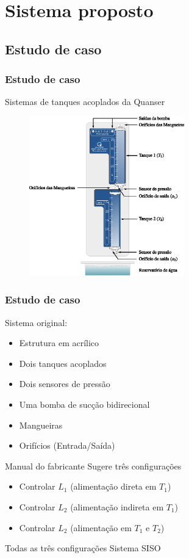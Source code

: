 \documentclass{beamer}
\begin{document}
\section{Sistema proposto}
\subsection{Estudo de caso}
\begin{frame}
    \frametitle{Estudo de caso}

    Sistemas de tanques acoplados da Quanser\reg

\begin{figure}[htb]
\centering
    \includegraphics[width=0.6\textwidth]{imgs/sistema/eps/tanques}
\end{figure}
\end{frame}

\begin{frame}
    \frametitle{Estudo de caso}

    Sistema original:

\begin{itemize}
    \item Estrutura em acrílico
    \item Dois tanques acoplados
    \item Dois sensores de pressão
    \item Uma bomba de sucção bidirecional
    \item Mangueiras
    \item Orifícios (Entrada/Saída)
\end{itemize}

    Manual do fabricante \implica Sugere três configurações

\begin{itemize}
    \item Controlar $L_1$ (alimentação direta em $T_1$)
    \item Controlar $L_2$ (alimentação indireta em $T_1$)
    \item Controlar $L_2$ (alimentação em $T_1$ e $T_2$)
\end{itemize}

    Todas as três configurações \implica Sistema SISO
\end{frame}
\end{document}
